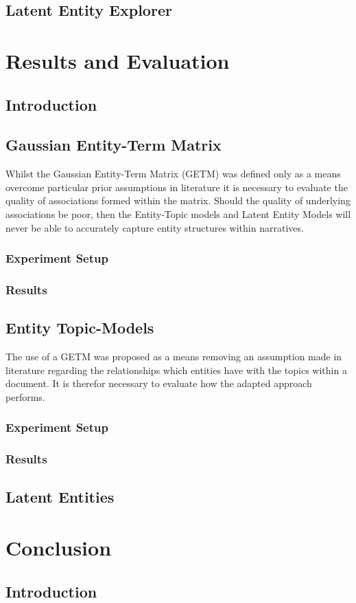 \documentclass[10pt]{report}
\begin{document}
\section{Latent Entity Explorer}
%
%
%
%
%
\chapter{Results and Evaluation}
\section{Introduction}

\section{Gaussian Entity-Term Matrix}
Whilst the Gaussian Entity-Term Matrix (GETM) was defined only as a means overcome particular prior assumptions in literature it is necessary to evaluate the quality of associations formed within the matrix. Should the quality of underlying associations be poor, then the Entity-Topic models and Latent Entity Models will never be able to accurately capture entity structures within narratives.

\subsection{Experiment Setup}

\subsection{Results}

\section{Entity Topic-Models}
The use of a GETM was proposed as a means removing an assumption made in literature regarding the relationships which entities have with the topics within a document. It is therefor necessary to evaluate how the adapted approach performs.

\subsection{Experiment Setup}

\subsection{Results}

\section{Latent Entities}

%
%
%
%
%
\chapter{Conclusion}
\section{Introduction}

\renewcommand{\baselinestretch}{1.0}\normalsize


\end{document}
